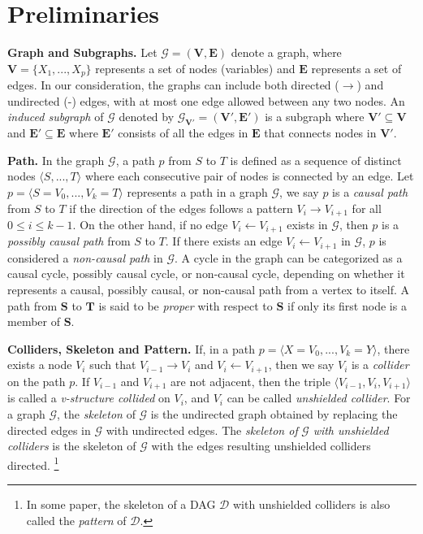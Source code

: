 \documentclass{article} %
\begin{document}
\section{Preliminaries} \label{Appendix: Preliminaries}

\textbf{Graph and Subgraphs.} Let $\mathcal{G}=(\mathbf{V}, \mathbf{E})$ denote a graph, where $\mathbf{V}=\{X_1,...,X_p\}$ represents a set of nodes (variables) and $\mathbf{E}$ represents a set of edges. In our consideration, the graphs can include both directed ($\rightarrow$) and undirected (-) edges, with at most one edge allowed between any two nodes. An \textit{induced subgraph} of $\mathcal{G}$ denoted by $\mathcal{G}_{\mathbf{V'}}=(\mathbf{V'}, \mathbf{E'})$ is a subgraph where $\mathbf{V'} \subseteq \mathbf{V}$ and $\mathbf{E'} \subseteq \mathbf{E}$ where $\mathbf{E'}$ consists of all the edges in $\mathbf{E}$ that connects nodes in $\mathbf{V'}$.

\textbf{Path.}
In the graph $\mathcal{G}$, a path $p$ from $S$ to $T$ is defined as a sequence of distinct nodes $\langle S,...,T\rangle$ where each consecutive pair of nodes is connected by an edge. Let $p=\langle S=V_{0},..., V_{k}=T\rangle $ represents a path in a graph $\mathcal{G}$, we say $p$ is a \textit{causal path} from $S$ to $T$ if the direction of the edges follows a pattern $V_i \rightarrow V_{i+1}$ for all $0 \leq i \leq k-1 $. On the other hand, if no edge $V_i \leftarrow V_{i+1}$ exists in $\mathcal{G}$, then $p$ is a \textit{possibly causal path} from $S$ to $T$. If there exists an edge $V_i \leftarrow V_{i+1}$ in $\mathcal{G}$, $p$ is considered a \textit{non-causal path} in $\mathcal{G}$. A cycle in the graph can be categorized as a causal cycle, possibly causal cycle, or non-causal cycle, depending on whether it represents a causal, possibly causal, or non-causal path from a vertex to itself. A path from $\mathbf{S}$ to $\mathbf{T}$ is said to be \textit{proper} with respect to $\mathbf{S}$ if only its first node is a member of $\mathbf{S}$.

\textbf{Colliders, Skeleton and Pattern.}
If, in a path $p=\langle X=V_{0},..., V_{k}=Y\rangle $, there exists a node $V_{i}$ such that $V_{i-1} \rightarrow V_i$ and $V_{i} \leftarrow V_{i+1}$, then we say $V_{i}$ is a \textit{collider} on the path $p$. If $V_{i-1}$ and $V_{i+1}$ are not adjacent, then the triple $\langle V_{i-1}, V_{i}, V_{i+1}\rangle $ is called a \textit{v-structure collided} on $V_{i}$, and $V_{i}$ can be called \textit{unshielded collider}. For a graph $\mathcal{G}$, the \textit{skeleton} of $\mathcal{G}$ is the undirected graph obtained by replacing the directed edges in $\mathcal{G}$ with undirected edges. The \textit{skeleton of} $\mathcal{G}$ \textit{with unshielded colliders} is the skeleton of $\mathcal{G}$ with the edges resulting unshielded colliders directed. \footnote{In some paper, the skeleton of a DAG $\mathcal{D}$ with unshielded colliders is also called the \textit{pattern} of $\mathcal{D}$.}
\end{document}
